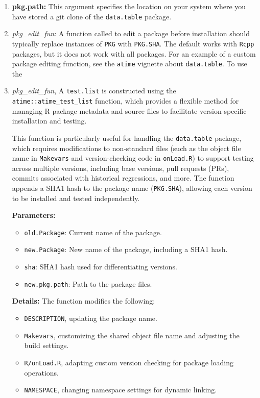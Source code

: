 \begin{enumerate}
    \item \textbf{pkg.path:} This argument specifies the location on your system where you have stored a git clone of the \texttt{data.table} package.

   \item \textit{pkg\_edit\_fun}: A function called to edit a package before installation should typically replace instances of \texttt{PKG} with \texttt{PKG.SHA}. The default works with \texttt{Rcpp} packages, but it does not work with all packages. For an example of a custom package editing function, see the \texttt{atime} vignette about \texttt{data.table}.
To use the  \item \textit{pkg\_edit\_fun}, A \texttt{test.list} is constructed using the \texttt{atime::atime\_test\_list} function, which provides a flexible method for managing R package metadata and source files to facilitate version-specific installation and testing.

This function is particularly useful for handling the \texttt{data.table} package, which requires modifications to non-standard files (such as the object file name in \texttt{Makevars} and version-checking code in \texttt{onLoad.R}) to support testing across multiple versions, including base versions, pull requests (PRs), commits associated with historical regressions, and more. The function appends a SHA1 hash to the package name (\texttt{PKG.SHA}), allowing each version to be installed and tested independently.

\textbf{Parameters:}
\begin{itemize}
    \item \texttt{old.Package}: Current name of the package.
    \item \texttt{new.Package}: New name of the package, including a SHA1 hash.
    \item \texttt{sha}: SHA1 hash used for differentiating versions.
    \item \texttt{new.pkg.path}: Path to the package files.
\end{itemize}

\textbf{Details:} The function modifies the following:
\begin{itemize}
    \item \texttt{DESCRIPTION}, updating the package name.
    \item \texttt{Makevars}, customizing the shared object file name and adjusting the build settings.
    \item \texttt{R/onLoad.R}, adapting custom version checking for package loading operations.
    \item \texttt{NAMESPACE}, changing namespace settings for dynamic linking.
\end{itemize}


\end{enumerate}
